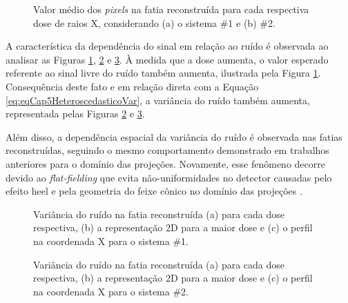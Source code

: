 \begin{figure}[htb]
	\centering
	\caption{Valor médio dos \textit{pixels} na fatia reconstruída para cada respectiva dose de raios X, considerando (a) o sistema \#1 e (b) \#2.}
	
	\label{fig:imgCap6Means}
\end{figure}

A característica da dependência do sinal em relação ao ruído é observada ao analisar as Figuras \ref{fig:imgCap6Means}, \ref{fig:imgCap6GE_Var} e \ref{fig:imgCap6HO_Var}. À medida que a dose aumenta, o valor esperado referente ao sinal livre do ruído também aumenta, ilustrada pela Figura \ref{fig:imgCap6Means}. Consequência deste fato e em relação direta com a Equação \ref{eq:eqCap5HeteroscedasticoVar}, a variância do ruído também aumenta, representada pelas Figuras \ref{fig:imgCap6GE_Var} e \ref{fig:imgCap6HO_Var}.

Além disso, a dependência espacial da variância do ruído é observada nas fatias reconstruídas, seguindo o mesmo comportamento demonstrado em trabalhos anteriores para o domínio das projeções. Novamente, esse fenômeno decorre devido ao \textit{flat-fielding} que evita não-uniformidades no detector causadas pelo efeito heel e pela geometria do feixe cônico no domínio das projeções \cite{borges2017pipeline,borges2017method, borges2018restoration,brito2018application,guerrero2018}.

\begin{figure}[htb]
	\centering
	\caption{Variância do ruído na fatia reconstruída (a) para cada dose respectiva, (b) a representação \acs{2D} para a maior dose e (c) o perfil na coordenada X para o sistema \#1.}

	\hfill
	\label{fig:imgCap6GE_Var}
\end{figure}

\begin{figure}[htb]
	\centering
	\caption{Variância do ruído na fatia reconstruída (a) para cada dose respectiva, (b) a representação \acs{2D} para a maior dose e (c) o perfil na coordenada X para o sistema \#2.}
	
	\hfil
	\label{fig:imgCap6HO_Var}
\end{figure}

